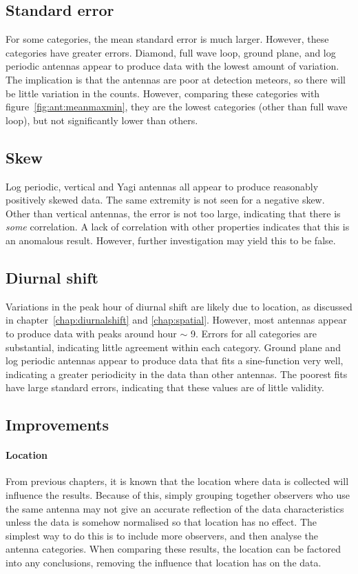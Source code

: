 \subsection{Standard error}
For some categories, the mean standard error is much larger. However, these categories have greater errors. Diamond, full wave loop, ground plane, and log periodic antennas appear to produce data with the lowest amount of variation. The implication is that the antennas are poor at detection meteors, so there will be little variation in the counts. However, comparing these categories with figure~\ref{fig:ant:meanmaxmin}, they are the lowest categories (other than full wave loop), but not significantly lower than others. 
\subsection{Skew}
Log periodic, vertical and Yagi antennas all appear to produce reasonably positively skewed data. The same extremity is not seen for a negative skew. Other than vertical antennas, the error is not too large, indicating that there is {\it some} correlation. A lack of correlation with other properties indicates that this is an anomalous result. However, further investigation may yield this to be false.
\subsection{Diurnal shift}
Variations in the peak hour of diurnal shift are likely due to location, as discussed in chapter~\ref{chap:diurnalshift} and \ref{chap:spatial}. However, most antennas appear to produce data with peaks around hour ${\sim}$ 9. Errors for all categories are substantial, indicating little agreement within each category. Ground plane and log periodic antennas appear to produce data that fits a sine-function very well, indicating a greater periodicity in the data than other antennas. The poorest fits have large standard errors, indicating that these values are of little validity.
\subsection{Improvements}
\paragraph{Location}
From previous chapters, it is known that the location where data is collected will influence the results. Because of this, simply grouping together observers who use the same antenna may not give an accurate reflection of the data characteristics unless the data is somehow normalised so that location has no effect. The simplest way to do this is to include more observers, and then analyse the antenna categories. When comparing these results, the location can be factored into any conclusions, removing the influence that location has on the data.
